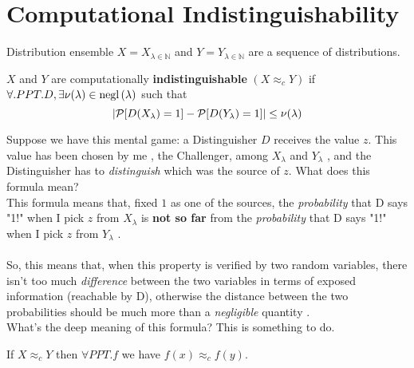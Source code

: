 \section{Computational Indistinguishability}
Distribution ensemble $X={X_{\lambda \in \mathbb{N}}}$ and $Y={Y_{\lambda \in
\mathbb{N} }}$  are a sequence of distributions.

\begin{definition}
    $X$ and $Y$ are computationally \textbf{indistinguishable} $(X
    \approx_{c} Y)$ if $ \forall. PPT. D, \exists \nu(\lambda) \in
    \negl{\lambda} $ such that
    \begin{equation}
    |   \P [ D(X_{\lambda})=1 ] - \P [ D(Y_{\lambda})=1 ]   | \le \nu(\lambda) 
    \end{equation}
\end{definition}


Suppose we have this mental game: a Distinguisher $D$ receives the value $z$.
This value has been chosen by me , the Challenger, among $X_{\lambda}$ and
$Y_{\lambda}$ , and the Distinguisher has to \textit{distinguish} which was the
source of $z$.
What does this formula mean?\\
This formula means that, fixed $1$ as one of the sources, the
\textit{probability}  that D says "1!" when I pick $z$ from $X_{\lambda}$ is \textbf{not
so far}  from the \textit{probability}  that D says "1!" when I pick $z$ from
$Y_{\lambda}$ .\\
\\
So, this means that, when this property is verified by two random variables, 
there isn't too much \textit{difference} between the two
variables in terms of exposed information (reachable by D), otherwise the distance 
between the two probabilities should be much more than a \textit{negligible}
quantity .\\
What's the deep meaning of this formula? This is something to do.

\begin{lemma}\label{lem:tria}
    If $X \approx_{c} Y  $ then $ \forall PPT. f$  we have $f(x) \approx_{c}
    f(y)$.
\end{lemma}

